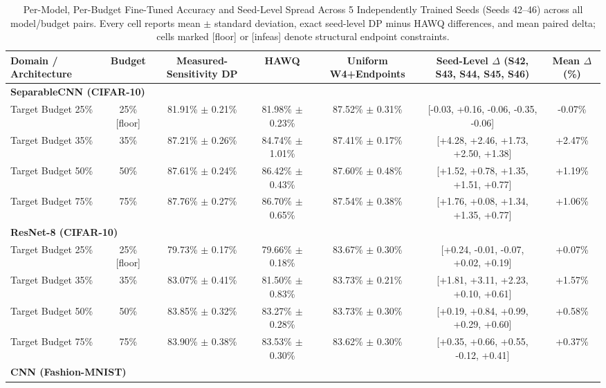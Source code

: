\begin{table}[!t]
\centering
\caption{Per-Model, Per-Budget Fine-Tuned Accuracy and Seed-Level Spread Across 5 Independently Trained Seeds (Seeds 42--46) across all model/budget pairs. Every cell reports mean $\pm$ standard deviation, exact seed-level DP minus HAWQ differences, and mean paired delta; cells marked [floor] or [infeas] denote structural endpoint constraints.}
\label{tab:seed_level}
\scriptsize
\setlength{\tabcolsep}{2.0pt}
\begin{tabular}{lcccccc}
\toprule
\textbf{Domain / Architecture} & \textbf{Budget} & \textbf{Measured-Sensitivity DP} & \textbf{HAWQ} & \textbf{Uniform W4+Endpoints} & \textbf{Seed-Level $\Delta$ (S42, S43, S44, S45, S46)} & \textbf{Mean $\Delta$ (\%)} \\
\midrule
\multicolumn{7}{l}{\textbf{SeparableCNN (CIFAR-10)}}\\
\quad Target Budget 25\% & 25\% [floor] & 81.91\% $\pm$ 0.21\% & 81.98\% $\pm$ 0.23\% & 87.52\% $\pm$ 0.31\% & [-0.03, +0.16, -0.06, -0.35, -0.06] & -0.07\% \\
\quad Target Budget 35\% & 35\% & 87.21\% $\pm$ 0.26\% & 84.74\% $\pm$ 1.01\% & 87.41\% $\pm$ 0.17\% & [+4.28, +2.46, +1.73, +2.50, +1.38] & +2.47\% \\
\quad Target Budget 50\% & 50\% & 87.61\% $\pm$ 0.24\% & 86.42\% $\pm$ 0.43\% & 87.60\% $\pm$ 0.48\% & [+1.52, +0.78, +1.35, +1.51, +0.77] & +1.19\% \\
\quad Target Budget 75\% & 75\% & 87.76\% $\pm$ 0.27\% & 86.70\% $\pm$ 0.65\% & 87.54\% $\pm$ 0.38\% & [+1.76, +0.08, +1.34, +1.35, +0.77] & +1.06\% \\
\midrule
\multicolumn{7}{l}{\textbf{ResNet-8 (CIFAR-10)}}\\
\quad Target Budget 25\% & 25\% [floor] & 79.73\% $\pm$ 0.17\% & 79.66\% $\pm$ 0.18\% & 83.67\% $\pm$ 0.30\% & [+0.24, -0.01, -0.07, +0.02, +0.19] & +0.07\% \\
\quad Target Budget 35\% & 35\% & 83.07\% $\pm$ 0.41\% & 81.50\% $\pm$ 0.83\% & 83.73\% $\pm$ 0.21\% & [+1.81, +3.11, +2.23, +0.10, +0.61] & +1.57\% \\
\quad Target Budget 50\% & 50\% & 83.85\% $\pm$ 0.32\% & 83.27\% $\pm$ 0.28\% & 83.73\% $\pm$ 0.30\% & [+0.19, +0.84, +0.99, +0.29, +0.60] & +0.58\% \\
\quad Target Budget 75\% & 75\% & 83.90\% $\pm$ 0.38\% & 83.53\% $\pm$ 0.30\% & 83.62\% $\pm$ 0.30\% & [+0.35, +0.66, +0.55, -0.12, +0.41] & +0.37\% \\
\midrule
\multicolumn{7}{l}{\textbf{CNN (Fashion-MNIST)}}\\

\end{tabular}
\end{table}
